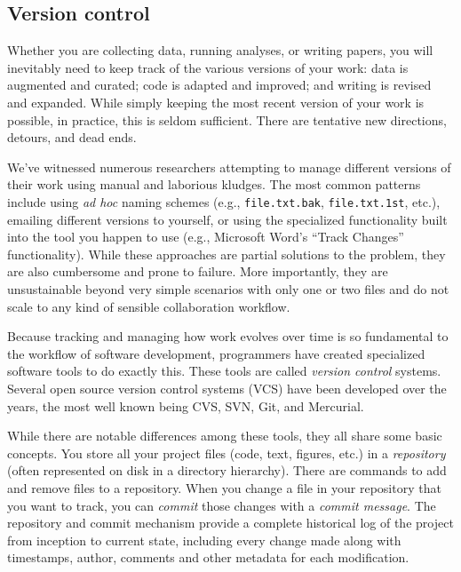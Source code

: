 \documentclass[ChapterTOCs,krantz2]{krantz} %
\begin{document}
\subsection{Version control}

Whether you are collecting data, running analyses, or writing papers, you will
inevitably need to keep track of the various versions of your work: data is
augmented and curated; code is adapted and improved; and writing is revised and
expanded.  While simply keeping the most recent version of your work is
possible, in practice, this is seldom sufficient.  There are tentative new
directions, detours, and dead ends.

We've witnessed numerous researchers attempting to manage different versions of
their work using manual and laborious kludges. The most common patterns include
using \emph{ad hoc} naming schemes (e.g., \texttt{file.txt.bak},
\texttt{file.txt.1st}, etc.), emailing different versions to yourself, or using
the specialized functionality built into the tool you happen to use (e.g.,
Microsoft Word's ``Track Changes'' functionality).  While these approaches are
partial solutions to the problem, they are also cumbersome and prone to
failure.  More importantly, they are unsustainable beyond very
simple scenarios with only one or two files and do not scale to any kind of
sensible collaboration workflow.

Because tracking and managing how work evolves over time is so fundamental to
the workflow of software development, programmers have created specialized
software tools to do exactly this. These tools are called \emph{version
  control} systems. Several open source version control systems (VCS) have been
developed over the years, the most well known being CVS, SVN, Git, and
Mercurial.

While there are notable differences among these tools, they all share some
basic concepts.  You store all your project files (code,
text, figures, etc.) in a \emph{repository} (often represented on disk in a
directory hierarchy).  There are commands to add and remove files to a
repository.  When you change a file in your repository that you want to track,
you can \emph{commit} those changes with a \emph{commit message}.  The
repository and commit mechanism provide a complete historical log of the
project from inception to current state, including every change made along with
timestamps, author, comments and other metadata for each modification.
\end{document}
